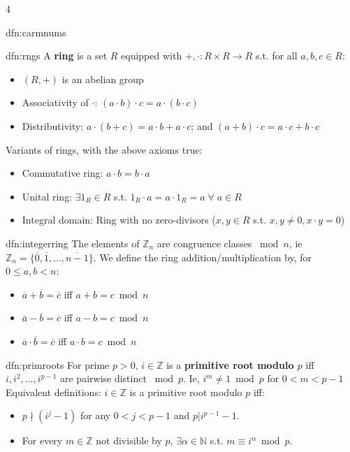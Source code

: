 \documentclass[landscape, 8pt]{extarticle}
\begin{document}
\begin{multicols*}{4}
\begin{dfn}{dfn:carmnums}{ }
		\end{dfn}
		
		
		\begin{mdfn}{dfn:rngs}{ }
			A \textbf{ring} is a set $R$ equipped with $+, \cdot : R\times R \to R$ s.t. for all $a, b, c\in R$:
			\begin{itemize}
				\item $(R, +)$ is an abelian group
				\item Associativity of $\cdot$: $(a \cdot b) \cdot c = a \cdot (b \cdot c)$
				\item Distributivity: $a\cdot(b+c) = a\cdot b + a \cdot c$; and $(a+b)\cdot c = a \cdot c + b\cdot c$
			\end{itemize}
			Variants of rings, with the above axioms true:
			\begin{itemize}
				\item Commutative ring: $a \cdot b = b \cdot a$
				\item Unital ring: $\exists 1_R\in R$ s.t. $1_R \cdot a = a \cdot 1_R = a \; \forall \; a\in R$
				\item Integral domain: Ring with no zero-divisors ($x, y\in R$ s.t. $x, y \ne 0, x \cdot y = 0$)
			\end{itemize}
			
		\end{mdfn}
		
		
		\begin{dfn}{dfn:integerring}{ }
			The elements of $\mathbb{Z}_n$ are congruence classes $\bmod{n}$, ie $\mathbb{Z}_n = \{\overline{0}, \overline{1}, ..., \overline{n-1}\}$. We define the ring addition/multiplication by, for $0\le a, b < n$:
			\begin{itemize}
				\item $\overline{a} + \overline{b} = \overline{c}$ iff $a+b = c \bmod{n}$
				\item $\overline{a} - \overline{b} = \overline{c}$ iff $a-b = c \bmod{n}$
				\item $\overline{a} \cdot\overline{b} = \overline{c}$ iff $a \cdot b = c \bmod{n}$
			\end{itemize}
			
		\end{dfn}
		
		
		\begin{dfn}{dfn:primroots}{ }
			For prime $p>0$, $i\in \mathbb{Z}$ is a \textbf{primitive root modulo $p$} iff $i, i^2, \dots, i^{p-1}$ are pairwise distinct $\bmod{p}$. Ie, $i^{m} \ne 1 \bmod{p}$ for $0 < m < p-1$ \\
			Equivalent definitions: $i\in \mathbb{Z}$ is a primitive root modulo $p$ iff:
			\begin{itemize}
				\item $p \nmid (i^j -1)$ for any $0 < j < p-1$ and $p | i^{p-1} - 1$.
				\item For every $m\in\mathbb{Z}$ not divisible by $p$, $\exists \alpha\in \mathbb{N}$ s.t. $m \equiv i^{\alpha} \bmod{p}$.
			\end{itemize}
			

\end{dfn}
\end{multicols*}
\end{document}

